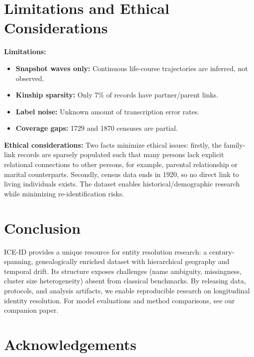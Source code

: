 \documentclass{article}
\begin{document}

\section{Limitations and Ethical Considerations}
\label{sec:limitations}

\textbf{Limitations:}
\begin{itemize}
    \item \textbf{Snapshot waves only:} Continuous life-course trajectories are inferred, not observed.
    \item \textbf{Kinship sparsity:} Only 7\% of records have partner/parent links.
    \item \textbf{Label noise:} Unknown amount of transcription error rates.
    \item \textbf{Coverage gaps:} 1729 and 1870 censuses are partial.
\end{itemize}

\textbf{Ethical considerations:} Two facts minimize ethical issues: firstly, the family-link records are sparsely populated such that many persons lack explicit relational connections to other persons, for example, parental relationship or marital counterparts. Secondly, census data ends in 1920, so no direct link to living individuals exists. The dataset enables historical/demographic research while minimizing re-identification risks.




\section{Conclusion}

ICE-ID provides a unique resource for entity resolution research: a century-spanning, genealogically enriched dataset with hierarchical geography and temporal drift. Its structure exposes challenges (name ambiguity, missingness, cluster size heterogeneity) absent from classical benchmarks. By releasing data, protocols, and analysis artifacts, we enable reproducible research on longitudinal identity resolution. For model evaluations and method comparisons, see our companion paper.

\section*{Acknowledgements}
\end{document}
